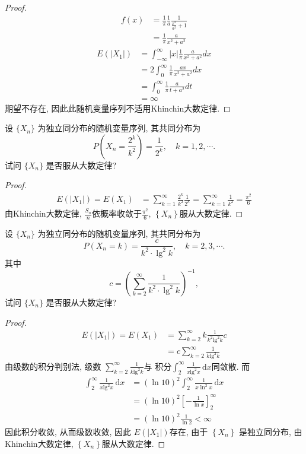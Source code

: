 \documentclass[../main.tex]{subfiles}
\begin{document}
\begin{proof}
 $$ \begin{aligned} f \left(x\right)&= \frac{1 }{\pi  }\frac{1 }{a }\frac{1 }{\frac{x^{2} }{a^{2} }+ 1 }\\&= \frac{1 }{\pi  }\frac{a }{x^{2}+ a^{2} } \end{aligned} $$ 
  $$ \begin{aligned} E\left(\left| X_1 \right| \right)&= \int_{-\infty}^{\infty}\left| x \right|\frac{1 }{\pi  }\frac{a }{x^{2}+ a^{2} } dx\\&=   2\int_{0}^{\infty}\frac{1 }{\pi  }\frac{ax }{x^{2}+ a^{2} }dx\\&= \int_{0}^{\infty}\frac{1 }{\pi  }\frac{a }{t+ a^{2} }dt \\&= \infty\end{aligned} $$ 
期望不存在, 因此此随机变量序列不适用Khinchin大数定律.
\end{proof}
\begin{exercise}{}{}
设 $\{X_n\}$ 为独立同分布的随机变量序列, 其共同分布为
$$P\left(X_n = \frac{2^k}{k^2}\right) = \frac{1}{2^k}, \quad k = 1, 2, \cdots.$$
试问 $\{X_n\}$ 是否服从大数定律?
\end{exercise}
\begin{proof}
  $$ \begin{aligned}E\left(\left| X_1 \right| \right)=  E\left(X_{1}\right)&= \sum _{k= 1}^{\infty}\frac{2^{k} }{k^{2} }\frac{1 }{2^{k} }= \sum _{k= 1}^{\infty}\frac{1 }{k^{2} } = \frac{\pi ^{2} }{6 }\end{aligned}  $$ 
由Khinchin大数定律, $\frac{S_{n} }{n }$依概率收敛于$\frac{\pi ^{2} }{6 }$, $\left\{ X_{n} \right\}$服从大数定律.
\end{proof}
\begin{exercise}{}{}
设 $\{X_n\}$ 为独立同分布的随机变量序列, 其共同分布为
$$P(X_n = k) = \frac{c}{k^2 \cdot \operatorname{lg}^2 k}, \quad k = 2, 3, \cdots.$$
其中
$$c = \left( \sum_{k=2}^{\infty} \frac{1}{k^2 \cdot \operatorname{lg}^2 k} \right)^{-1},$$
试问 $\{X_n\}$ 是否服从大数定律?
\end{exercise}
\begin{proof}
 $$ \begin{aligned}E\left(\left| X_1 \right| \right)=  E\left(X_1\right)&= \sum _{k= 2}^{\infty}k\frac{1 }{k^{2}\mathrm{lg}^{2}k }c\\&= c \sum _{k= 2}^{\infty}\frac{1 }{k \mathrm{lg}^{2}k } \end{aligned} $$ 
由级数的积分判别法, 级数 $\sum _{k= 2}^{\infty}\frac{1 }{k \mathrm{lg}^{2}k }$与 积分$\int_{2}^{\infty}\frac{1 }{x \mathrm{lg}^{2}x }\,\mathrm{d} x$同敛散. 而 
 $$ \begin{aligned} \int_{2}^{\infty}\frac{1 }{x \mathrm{lg}^{2}x } \,\mathrm{d} x&= \left(\ln 10\right)^{2}\int_{2}^{\infty}\frac{1 }{x \ln  ^{2}x}\,\mathrm{d} x\\&= \left(\ln 10\right)^{2} \left[ - \frac{1 }{\ln x } \right]_{2}^{\infty}\\&= \left(\ln 10\right)^{2}\frac{1 }{\ln 2 }< \infty \end{aligned} $$
因此积分收敛, 从而级数收敛, 因此 $E\left(\left| X_1 \right| \right)$存在, 由于 $\left\{ X_{n} \right\}$ 是独立同分布, 由Khinchin大数定律, $\left\{ X_{n}\right\}$服从大数定律.
\end{proof}
\end{document}
